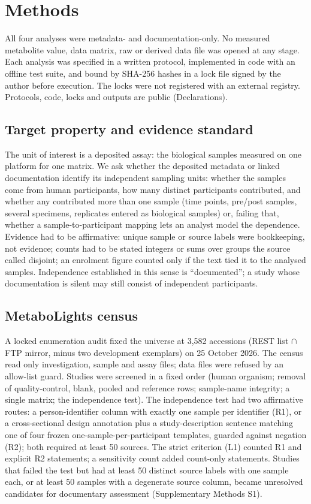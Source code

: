 \section{Methods}\label{sec:methods}

All four analyses were metadata- and documentation-only. No measured metabolite value, data matrix, raw or derived
data file was opened at any stage. Each analysis was specified in a written protocol, implemented in code with an
offline test suite, and bound by SHA-256 hashes in a lock file signed by the author before execution. The locks were
not registered with an external registry. Protocols, code, locks and outputs are public
(Declarations).

\subsection{Target property and evidence standard}\label{sec:target}

The unit of interest is a deposited assay: the biological samples measured on one platform for one matrix. We ask
whether the deposited metadata or linked documentation identify its independent sampling units: whether the samples
come from human participants, how many distinct participants contributed, and whether any contributed more than one
sample (time points, pre/post samples, several specimens, replicates entered as biological samples) or, failing that,
whether a sample-to-participant mapping lets an analyst model the dependence. Evidence had to be affirmative: unique
sample or source labels were bookkeeping, not evidence; counts had to be stated integers or sums over groups the source
called disjoint; an enrolment figure counted only if the text tied it to the analysed samples. Independence established
in this sense is ``documented''; a study whose documentation is silent may still consist of independent participants.

\subsection{MetaboLights census}\label{sec:census}

A locked enumeration audit fixed the universe at 3,582 accessions (REST list $\cap$ FTP mirror, minus two
development exemplars) on 25 October 2026. The census read only investigation, sample and assay files; data files were
refused by an allow-list guard. Studies were screened in a fixed order (human organism; removal of quality-control,
blank, pooled and reference rows; sample-name integrity; a single matrix; the independence test). The independence test
had two affirmative routes: a person-identifier column with exactly one sample per identifier (R1), or a
cross-sectional design annotation plus a study-description sentence matching one of four frozen
one-sample-per-participant templates, guarded against negation (R2); both required at least 50 sources. The strict
criterion (L1) counted R1 and explicit R2 statements; a sensitivity count added count-only statements. Studies that
failed the test but had at least 50 distinct source labels with one sample each, or at least 50 samples with a
degenerate source column, became unresolved candidates for documentary assessment (Supplementary Methods S1).

